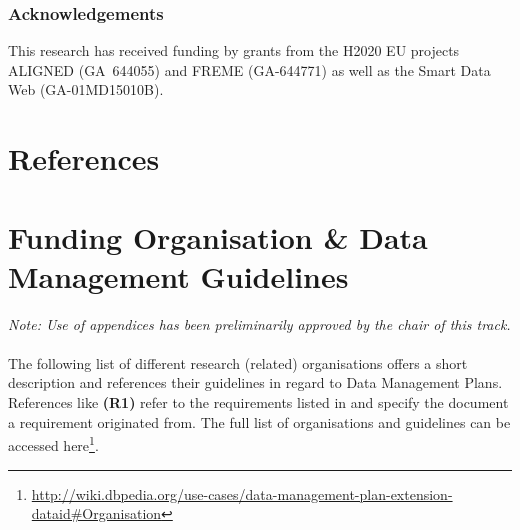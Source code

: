 \documentclass[runningheads,a4paper]{llncs}
\newcommand\footnoteurl[1]{\footnote{\scriptsize\url{#1}}}
\begin{document}
\subsubsection{Acknowledgements}
This research has received funding by grants from the H2020 EU projects ALIGNED (GA~644055) and FREME (GA-644771) as well as the Smart Data Web (GA-01MD15010B).

\section{References}
\printbibliography[heading=none, title=References]

\iffalse
\newpage
\appendix


\section{Funding Organisation \& Data Management Guidelines}
\label{app2-fundingBodies}
\emph{Note: Use of appendices has been preliminarily approved by the chair of this track.}\\\\
The following list of different research (related) organisations offers a short description and references their guidelines in regard to Data Management Plans. References like \textbf{(R1)} refer to the requirements listed in  and specify the document a requirement originated from. The full list of organisations and guidelines can be accessed here\footnoteurl{http://wiki.dbpedia.org/use-cases/data-management-plan-extension-dataid\#Organisation}.
\end{document}
